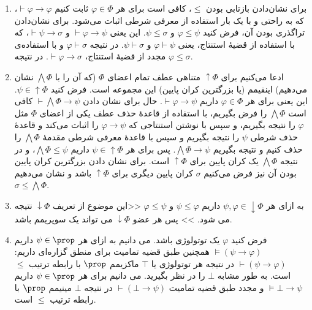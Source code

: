 \begin{ans}
    \begin{enumerate}[label=(\alph*)]
        \item برای نشان‌دادن بازتابی بودن $\leq$، کافی است برای هر $\varphi \in \Phi$ ثابت کنیم $\vdash \varphi \rightarrow \varphi$، که به راحتی و با یک بار استفاده از معرفی شرطی اثبات می‌شود.
        برای نشان‌دادن تراگذری بودن آن، فرض کنید
        $\varphi\leq\psi$
        و
        $\psi\leq\sigma$.
        این یعنی
        $\vdash\varphi\to\psi$
        و
        $\vdash\psi\to\sigma$، که با استفاده از قضیهٔ استنتاج، یعنی $\varphi\vdash\psi$ و $\psi\vdash\sigma$. در نتیجه $\varphi\vdash\sigma$ و با استفاده‌ی مجدد از قضیهٔ استنتاج، $\vdash\varphi\rightarrow\sigma$. در نتیجه $\varphi\leq\sigma$.
        
        \item ادعا می‌کنیم برای
        $\uparrow\Phi$
        متناهی عطف تمام اعضای
        $\Phi$
        (که آن را با
        $\bigwedge\Phi$
        نشان می‌دهیم)
        اینفیمم (یا بزرگترین کران پایین) این مجموعه است.
        فرض کنید
        $\psi\in\uparrow\Phi$.
        این یعنی برای هر
        $\varphi\in\Phi$
        داریم
        $\vdash\varphi\to\psi$.
        حال برای نشان دادن
        $\vdash\bigwedge\Phi\to\psi$
        کافی است
        $\bigwedge\Phi$
        را فرض بگیریم، با استفاده از قاعدهٔ حذف عطف یکی از اعضای
        $\Phi$
        مثل
        $\varphi$
        را نتیجه بگیریم، و سپس با نوشتن استنتاجی که
        $\varphi\to\psi$
        را اثبات می‌کند و قاعدهٔ حذف شرطی
        $\psi$
        را نتیجه بگیریم و سپس با قاعدهٔ معرفی شرطی مقدمهٔ
        $\bigwedge\Phi$
        را حذف کنیم و نتیجه بگیریم
        $\bigwedge\Phi\to\psi$. پس برای هر ‌$\psi\in\uparrow\Phi$ داریم $\bigwedge\Phi\leq\psi$، و در نتیجه $\bigwedge\Phi$ یک کران پایین برای $\uparrow\Phi$ است. برای نشان دادن بزرگترین کران پایین بودن آن نیز فرض می‌کنیم $\sigma$ کران پایین دیگری برای $\uparrow\Phi$ باشد و نشان می‌دهیم $\sigma\leq\bigwedge\Phi$.
        
        \item 
        به ازای هر 
        $\psi,\varphi\in\downarrow\Phi$
        داریم
        $\psi\leq\varphi$
        و
        $\varphi\leq\psi$
        <<این موضوع از تعریف 
        $\downarrow\Phi$
        نتیجه می شود. >>
        پس هر عضو 
        $\downarrow\Phi$
        می تواند یک سوپریمم باشد.
        \item  
        فرض کنید 
        $\varphi$
        یک توتولوژی باشد. 
        می دانیم به ازای هر 
        $\psi\in\prop$
        داریم
        $\models(\psi\to\varphi)$
        همچنین طبق قضیه تمامیت برای منطق گزاره‌ای داریم:
        $\vdash(\psi\to\varphi)$
        در نتیجه هر توتولوژی یا
        $\top$
        ماکزیمم 
        $\prop$
        با رابطه ترتیب 
        $\leq$
        است.
        به طور مشابه 
        $\bot$
        را در نظر بگیرید. 
        می دانیم برای هر 
        $\psi\in\prop$
        داریم 
        $\models\bot\to\psi$
        و مجدد طبق قضیه تمامیت
        $\vdash(\bot\to\psi)$
        در نتیجه 
        $\bot$
        مینیمم 
        $\prop$
        با رابطه ترتیب
        $\leq$
        است.


\end{enumerate}
\end{ans}

